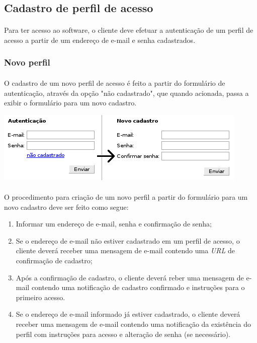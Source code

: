 \documentclass[a4paper,12pt]{article}
\def\url{\emph{URL}}
\begin{document}
\subsection{Cadastro de perfil de acesso}

\paragraph{}
Para ter acesso ao software, o cliente deve efetuar a autenticação de um perfil
de acesso a partir de um endereço de e-mail e senha cadastrados.

\subsubsection{Novo perfil}

\paragraph{}
O cadastro de um novo perfil de acesso é feito a partir do formulário de
autenticação, através da opção "não cadastrado", que quando acionada, passa a
exibir o formulário para um novo cadastro. 

\begin{center}
\includegraphics[scale=0.8]{authform.png}
\end{center}

\paragraph{}
O procedimento para criação de um novo perfil a partir do formulário para um
novo cadastro deve ser feito como segue:

\begin{enumerate}
\item Informar um endereço de e-mail, senha e confirmação de senha;
\item Se o endereço de e-mail não estiver cadastrado em um perfil de acesso, o
cliente deverá receber uma mensagem de e-mail contendo uma \url{} de
confirmação de cadastro;
\item Após a confirmação de cadastro, o cliente deverá reber uma mensagem de
e-mail contendo uma notificação de cadastro confirmado e instruções para o
primeiro acesso.
\item Se o endereço de e-mail informado já estiver cadastrado, o cliente deverá
receber uma mensagem de e-mail contendo uma notificação da existência do perfil
com instruções para acesso e alteração de senha (se necessário).
\end{enumerate}
\end{document}
